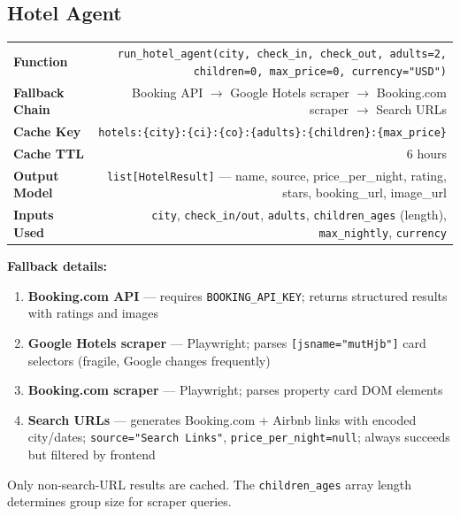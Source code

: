 \documentclass[11pt,a4paper]{article}
\begin{document}
\subsection{Hotel Agent}
\begin{infobox}
{\small
\begin{tabularx}{\textwidth}{@{}L{3cm}R@{}}
\textbf{Function}     & \texttt{run\_hotel\_agent(city, check\_in, check\_out, adults=2, children=0, max\_price=0, currency="USD")} \\[3pt]
\textbf{Fallback Chain} & Booking API $\to$ Google Hotels scraper $\to$ Booking.com scraper $\to$ Search URLs \\[3pt]
\textbf{Cache Key}     & \texttt{hotels:\{city\}:\{ci\}:\{co\}:\{adults\}:\{children\}:\{max\_price\}} \\[3pt]
\textbf{Cache TTL}     & 6 hours \\[3pt]
\textbf{Output Model}  & \texttt{list[HotelResult]} --- name, source, price\_per\_night, rating, stars, booking\_url, image\_url \\[3pt]
\textbf{Inputs Used}   & \texttt{city}, \texttt{check\_in/out}, \texttt{adults}, \texttt{children\_ages} (length), \texttt{max\_nightly}, \texttt{currency} \\
\end{tabularx}}

\textbf{Fallback details:}
\begin{enumerate}[nosep]
\item \textbf{Booking.com API} --- requires \texttt{BOOKING\_API\_KEY}; returns structured results with ratings and images
\item \textbf{Google Hotels scraper} --- Playwright; parses \texttt{[jsname="mutHjb"]} card selectors (fragile, Google changes frequently)
\item \textbf{Booking.com scraper} --- Playwright; parses property card DOM elements
\item \textbf{Search URLs} --- generates Booking.com + Airbnb links with encoded city/dates; \texttt{source="Search Links"}, \texttt{price\_per\_night=null}; always succeeds but filtered by frontend
\end{enumerate}
Only non-search-URL results are cached. The \texttt{children\_ages} array length determines group size for scraper queries.
\end{infobox}

\end{document}
